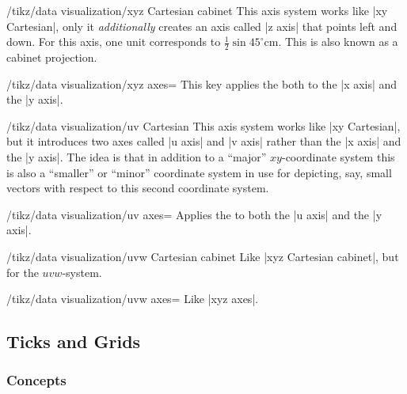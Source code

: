 \begin{key}{/tikz/data visualization/xyz Cartesian cabinet}
  This axis system works like |xy Cartesian|, only it
  \emph{additionally} creates an axis called |z axis| that points left
  and down. For this axis, one unit corresponds to $\frac{1}{2}\sin
  45^\circ\mathrm{cm}$. This is also known as a cabinet projection.

  \begin{key}{/tikz/data visualization/xyz axes=}
    This key applies the  both to the |x axis| and the
    |y axis|.
  \end{key}

\end{key}


\begin{key}{/tikz/data visualization/uv Cartesian}
  This axis system works like |xy Cartesian|, but it introduces two
  axes called |u axis| and |v axis| rather than the |x axis| and the
  |y axis|. The idea is that in addition to a ``major''
  $xy$-coordinate system this is also a ``smaller'' or ``minor''
  coordinate system in use for depicting, say, small vectors with
  respect to this second coordinate system.

  \begin{key}{/tikz/data visualization/uv axes=}
    Applies the  to both the |u axis| and the |y axis|.
  \end{key}

\end{key}

\begin{key}{/tikz/data visualization/uvw Cartesian cabinet}
  Like |xyz Cartesian cabinet|, but for the $uvw$-system.

  \begin{key}{/tikz/data visualization/uvw axes=}
    Like |xyz axes|.
  \end{key}
\end{key}



\subsection{Ticks and Grids}
\label{section-dv-ticks-and-grids}


\subsubsection{Concepts}

